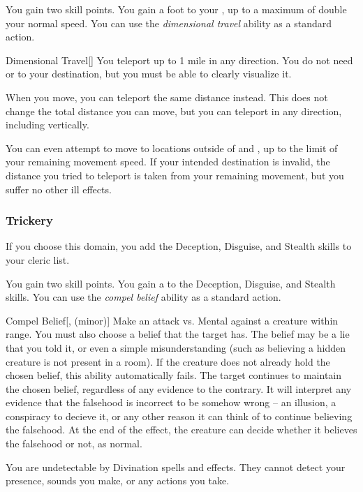              You gain two skill points.
             You gain a  foot  to your , up to a maximum of double your normal speed.
             You can use the \textit{dimensional travel} ability as a standard action.
            \begin{freeability}{Dimensional Travel}[]
                You teleport up to 1 mile in any direction.
                You do not need  or  to your destination, but you must be able to clearly visualize it.
            \end{freeability}
             When you move, you can teleport the same distance instead.
            This does not change the total distance you can move, but you can teleport in any direction, including vertically.

            You can even attempt to move to locations outside of  and , up to the limit of your remaining movement speed.
            If your intended destination is invalid, the distance you tried to teleport is taken from your remaining movement, but you suffer no other ill effects.

        \subsubsection{Trickery}
            If you choose this domain, you add the Deception, Disguise, and Stealth skills to your cleric  list.

             You gain two skill points.
             You gain a   to the Deception, Disguise, and Stealth skills.
             You can use the \textit{compel belief} ability as a standard action.
            \begin{freeability}{Compel Belief}[,  (minor)]
                Make an attack vs. Mental against a creature within \rngmed range.
                You must also choose a belief that the target has.
                The belief may be a lie that you told it, or even a simple misunderstanding (such as believing a hidden creature is not present in a room).
                If the creature does not already hold the chosen belief, this ability automatically fails.
                \hit The target continues to maintain the chosen belief, regardless of any evidence to the contrary.
                It will interpret any evidence that the falsehood is incorrect to be somehow wrong -- an illusion, a conspiracy to decieve it, or any other reason it can think of to continue believing the falsehood.
                At the end of the effect, the creature can decide whether it believes the falsehood or not, as normal.
            \end{freeability}
             You are undetectable by Divination spells and effects.
            They cannot detect your presence, sounds you make, or any actions you take.


